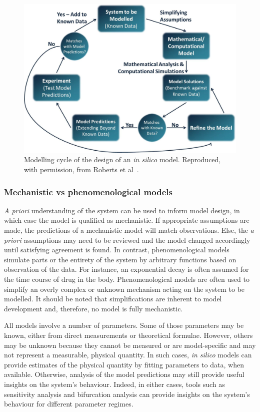 \documentclass{article}
\begin{document}
\begin{figure}[t!]
  \centering
  \includegraphics[width=.9\linewidth]{ModellingCycle}
  \caption{Modelling cycle of the design of an \textit{in silico} model. Reproduced, with permission, from Roberts et al~\cite{Roberts_2016}.}
  \label{fig:ModellingCycle}
\end{figure}

\subsubsection{Mechanistic vs phenomenological models}
\textit{A priori} understanding of the system can be used to inform model design, in which case the model is qualified as mechanistic.
If appropriate assumptions are made, the predictions of a mechanistic model will match observations.
Else, the \textit{a priori} assumptions may need to be reviewed and the model changed accordingly until satisfying agreement is found.
In contrast, phenomenological models simulate parts or the entirety of the system by arbitrary functions based on observation of the data.
For instance, an exponential decay is often assumed for the time course of drug in the body.
Phenomenological models are often used to simplify an overly complex or unknown mechanism acting on the system to be modelled.
It should be noted that simplifications are inherent to model development and, therefore, no model is fully mechanistic.

All models involve a number of parameters.
Some of those parameters may be known, either from direct measurements or theoretical formulae.
However, others may be unknown because they cannot be measured or are model-specific and may not represent a measurable, physical quantity.
In such cases, \textit{in silico} models can provide estimates of the physical quantity by fitting parameters to data, when available.
Otherwise, analysis of the model predictions may still provide useful insights on the system's behaviour.
Indeed, in either cases, tools such as sensitivity analysis and bifurcation analysis can provide insights on the system's behaviour for different parameter regimes.
\end{document}
